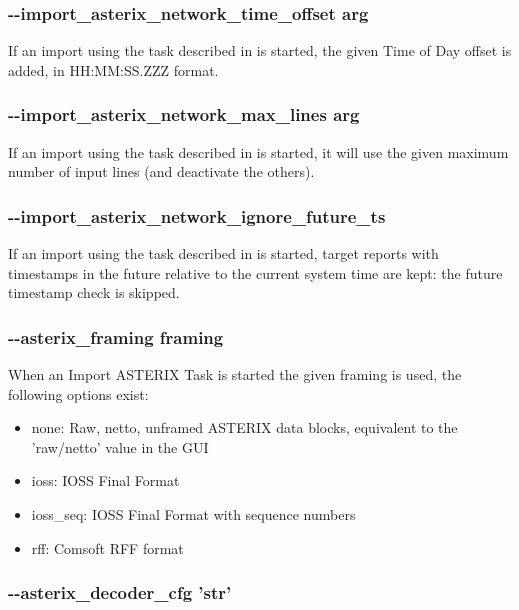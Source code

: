 \subsubsection{-{}-import\_asterix\_network\_time\_offset arg}

If an import using the task described in  is started, the given Time of Day offset is added, in HH:MM:SS.ZZZ format.

\subsubsection{-{}-import\_asterix\_network\_max\_lines arg}

If an import using the task described in  is started, it will use the given maximum number of input lines (and deactivate the others).

\subsubsection{-{}-import\_asterix\_network\_ignore\_future\_ts}

If an import using the task described in  is started, target reports with timestamps in the future relative to the current system time are kept: the future timestamp check is skipped.

\subsubsection{-{}-asterix\_framing framing}

When an Import ASTERIX Task is started the given framing is used, the following options exist:

\begin{itemize}
\item none:  Raw, netto, unframed ASTERIX data blocks, equivalent to the 'raw/netto' value in the GUI
\item ioss:  IOSS Final Format
\item ioss\_seq: IOSS Final Format with sequence numbers
\item rff: Comsoft RFF format
\end{itemize}

\subsubsection{-{}-asterix\_decoder\_cfg 'str'}

